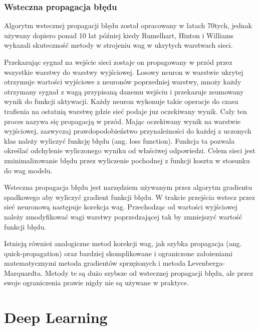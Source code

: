 \documentclass[12pt,a4paper,twoside,titlepage,openright]{book}
\begin{document}
\subsection{Wsteczna propagacja błędu}
Algorytm wstecznej propagacji błędu został opracowany w latach 70tych, jednak używany dopiero ponad 10 lat później kiedy Rumelhart, Hinton i Williams wykazali skuteczność metody w strojeniu wag w ukrytych warstwach sieci.

Przekazując sygnał na wejście sieci zostaje on propagowany w przód przez wszystkie warstwy do warstwy wyjściowej. Losowy neuron w warstwie ukrytej otrzymuje wartości wyjściowe z neuronów poprzedniej warstwy, mnoży każdy otrzymany sygnał z wagą przypisaną danemu wejściu i przekazuje zsumowany wynik do funkcji aktywacji. Każdy neuron wykonuje takie operacje do czasu trafienia na ostatnią warstwę gdzie sieć podaje juz oczekiwany wynik. Cały ten proces nazywa się propagacją w przód. Mając oczekiwany wynik na warstwie wyjściowej, zazwyczaj prawdopodobieństwo przynależności do każdej z uczonych klas należy wyliczyć funkcję błędu (ang. loss function). Funkcja ta pozwala określać odchylenie wyliczonego wyniku od właściwej odpowiedzi. Celem sieci jest zminimalizowanie błędu przez wyliczenie pochodnej z funkcji kosztu w stosunku do wag modelu.

Wsteczna propagacja błędu jest narzędziem używanym przez algorytm gradientu spadkowego aby wyliczyć gradient funkcji błędu. W trakcie przejścia wstecz przez sieć neuronową następuje korekcja wag. Przechodząc od wartości wyjściowej należy zmodyfikować wagi warstwy poprzedzającej tak by zmniejszyć wartość funkcji błędu.

Istnieją również analogiczne metod korekcji wag, jak szybka propagacja (ang. quick-propagation) oraz bardziej skomplikowane i ograniczone założeniami matematycznymi metoda gradientów sprzężonych i metoda Levenberga-Marquardta. Metody te są dużo szybsze od wstecznej propagacji błędu, ale przez swoje ograniczenia prawie nigdy nie są używane w praktyce.\cite{odkrywanieSieci}



\chapter{Deep Learning}
\end{document}
